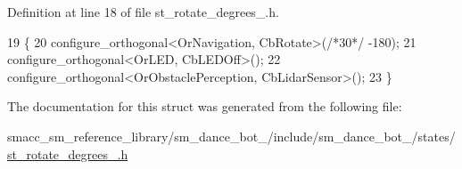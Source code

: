 Definition at line 18 of file st\+\_\+rotate\+\_\+degrees\+\_.\+h.


\begin{DoxyCode}
19   \{
20     configure\_orthogonal<OrNavigation, CbRotate>(\textcolor{comment}{/*30*/} -180);
21     configure\_orthogonal<OrLED, CbLEDOff>();
22     configure\_orthogonal<OrObstaclePerception, CbLidarSensor>();
23   \}
\end{DoxyCode}


The documentation for this struct was generated from the following file\+:\begin{DoxyCompactItemize}
\item 
smacc\+\_\+sm\+\_\+reference\+\_\+library/sm\+\_\+dance\+\_\+bot\+\_/include/sm\+\_\+dance\+\_\+bot\+\_/states/\hyperlink{3_2include_2sm__dance__bot__3_2states_2st__rotate__degrees__6_8h}{st\+\_\+rotate\+\_\+degrees\+\_.\+h}\end{DoxyCompactItemize}

